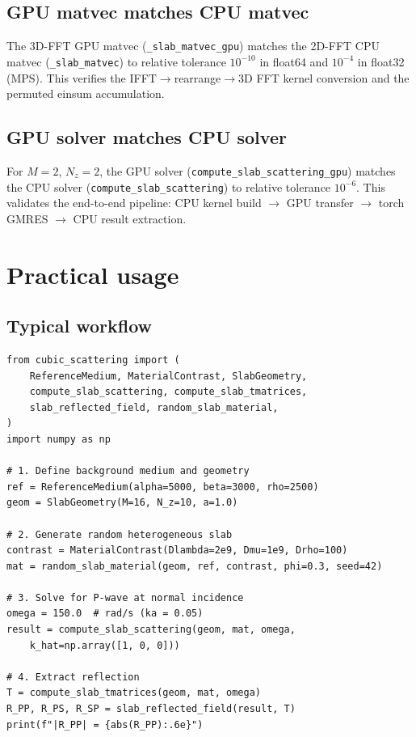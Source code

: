 \documentclass[11pt,a4paper]{article}
\begin{document}
\subsection{GPU matvec matches CPU matvec}

The 3D-FFT GPU matvec (\texttt{\_slab\_matvec\_gpu}) matches the
2D-FFT CPU matvec (\texttt{\_slab\_matvec}) to relative tolerance
$10^{-10}$ in float64 and $10^{-4}$ in float32 (MPS).  This
verifies the IFFT$\to$rearrange$\to$3D FFT kernel conversion and the
permuted einsum accumulation.

\subsection{GPU solver matches CPU solver}

For $M = 2$, $N_z = 2$, the GPU solver
(\texttt{compute\_slab\_scattering\_gpu}) matches the CPU solver
(\texttt{compute\_slab\_scattering}) to relative tolerance $10^{-6}$.
This validates the end-to-end pipeline: CPU kernel build $\to$
GPU transfer $\to$ torch GMRES $\to$ CPU result extraction.

\section{Practical usage}
\label{sec:usage}

\subsection{Typical workflow}

\begin{verbatim}
from cubic_scattering import (
    ReferenceMedium, MaterialContrast, SlabGeometry,
    compute_slab_scattering, compute_slab_tmatrices,
    slab_reflected_field, random_slab_material,
)
import numpy as np

# 1. Define background medium and geometry
ref = ReferenceMedium(alpha=5000, beta=3000, rho=2500)
geom = SlabGeometry(M=16, N_z=10, a=1.0)

# 2. Generate random heterogeneous slab
contrast = MaterialContrast(Dlambda=2e9, Dmu=1e9, Drho=100)
mat = random_slab_material(geom, ref, contrast, phi=0.3, seed=42)

# 3. Solve for P-wave at normal incidence
omega = 150.0  # rad/s (ka = 0.05)
result = compute_slab_scattering(geom, mat, omega,
    k_hat=np.array([1, 0, 0]))

# 4. Extract reflection
T = compute_slab_tmatrices(geom, mat, omega)
R_PP, R_PS, R_SP = slab_reflected_field(result, T)
print(f"|R_PP| = {abs(R_PP):.6e}")
\end{verbatim}
\end{document}
